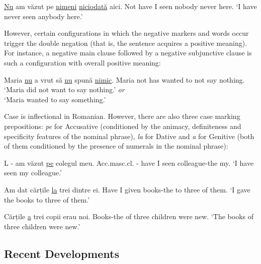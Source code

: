 \begin{multicols}{2}
\begin{example}
\gll \underline{Nu} am văzut pe \underline{nimeni} \underline{niciodată} aici.
Not {have I} seen {} nobody never here.
\glt `I have never seen anybody here.'
\glend
\end{example}

However, certain configurations in which the negative markers and words occur trigger the double negation (that is, the sentence acquires a positive meaning). For instance, a negative main clause followed by a negative subjunctive clause is such a configuration with overall positive meaning:

\begin{example}
\gll Maria \underline{nu} a vrut să \underline{nu} spună \underline{nimic}.
Maria not has wanted to not say nothing.
\glt `Maria did not want to say nothing.'  \textit{or}\\ `Maria wanted to say something.'
\glend
\end{example}

Case is inflectional in Romanian. However, there are also three case marking prepositions: \textit{pe} for Accusative (conditioned by the animacy, definiteness and specificity features of the nominal phrase), \textit{la} for Dative and \textit{a} for Genitive (both of them conditioned by the presence of numerals in the nominal phrase):

\begin{example}
\gll L - am văzut \underline{pe} colegul meu.
Acc.masc.cl. - {have I} seen {} {colleague-the my}.
\glt `I have seen my colleague.'
\glend
\end{example}

\begin{example}
\gll Am dat cărțile \underline{la} trei dintre ei.
{Have I} given books-the to three of them.
\glt `I gave the books to three of them.'
\glend
\end{example}

\begin{example}
\gll Cărțile \underline{a} trei copii erau noi.
Books-the of three children were new.
\glt `The books of three children were new.'
\glend
\end{example}


\subsection{Recent Developments}


\end{multicols}
